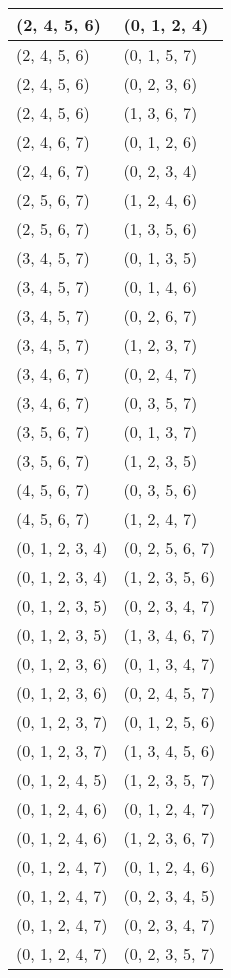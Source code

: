 \begin{footnotesize}
\begin{longtable}[c]{|l|l|}
(2, 4, 5, 6)
&(0, 1, 2, 4)
\\ \hline
(2, 4, 5, 6)
&(0, 1, 5, 7)
\\ \hline
(2, 4, 5, 6)
&(0, 2, 3, 6)
\\ \hline
(2, 4, 5, 6)
&(1, 3, 6, 7)
\\ \hline
(2, 4, 6, 7)
&(0, 1, 2, 6)
\\ \hline
(2, 4, 6, 7)
&(0, 2, 3, 4)
\\ \hline
(2, 5, 6, 7)
&(1, 2, 4, 6)
\\ \hline
(2, 5, 6, 7)
&(1, 3, 5, 6)
\\ \hline
(3, 4, 5, 7)
&(0, 1, 3, 5)
\\ \hline
(3, 4, 5, 7)
&(0, 1, 4, 6)
\\ \hline
(3, 4, 5, 7)
&(0, 2, 6, 7)
\\ \hline
(3, 4, 5, 7)
&(1, 2, 3, 7)
\\ \hline
(3, 4, 6, 7)
&(0, 2, 4, 7)
\\ \hline
(3, 4, 6, 7)
&(0, 3, 5, 7)
\\ \hline
(3, 5, 6, 7)
&(0, 1, 3, 7)
\\ \hline
(3, 5, 6, 7)
&(1, 2, 3, 5)
\\ \hline
(4, 5, 6, 7)
&(0, 3, 5, 6)
\\ \hline
(4, 5, 6, 7)
&(1, 2, 4, 7)
\\ \hline
(0, 1, 2, 3, 4)
&(0, 2, 5, 6, 7)
\\ \hline
(0, 1, 2, 3, 4)
&(1, 2, 3, 5, 6)
\\ \hline
(0, 1, 2, 3, 5)
&(0, 2, 3, 4, 7)
\\ \hline
(0, 1, 2, 3, 5)
&(1, 3, 4, 6, 7)
\\ \hline
(0, 1, 2, 3, 6)
&(0, 1, 3, 4, 7)
\\ \hline
(0, 1, 2, 3, 6)
&(0, 2, 4, 5, 7)
\\ \hline
(0, 1, 2, 3, 7)
&(0, 1, 2, 5, 6)
\\ \hline
(0, 1, 2, 3, 7)
&(1, 3, 4, 5, 6)
\\ \hline
(0, 1, 2, 4, 5)
&(1, 2, 3, 5, 7)
\\ \hline
(0, 1, 2, 4, 6)
&(0, 1, 2, 4, 7)
\\ \hline
(0, 1, 2, 4, 6)
&(1, 2, 3, 6, 7)
\\ \hline
(0, 1, 2, 4, 7)
&(0, 1, 2, 4, 6)
\\ \hline
(0, 1, 2, 4, 7)
&(0, 2, 3, 4, 5)
\\ \hline
(0, 1, 2, 4, 7)
&(0, 2, 3, 4, 7)
\\ \hline
(0, 1, 2, 4, 7)
&(0, 2, 3, 5, 7)
\\ \hline

\end{longtable}
\end{footnotesize}
